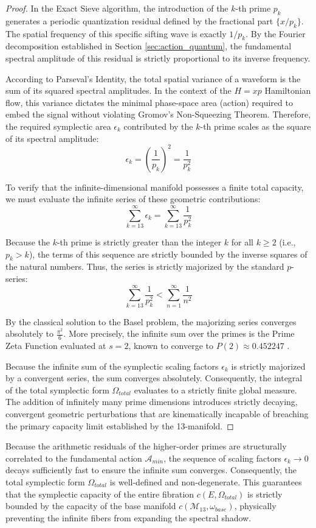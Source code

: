 \documentclass[sn-mathphys-num, pdflatex, referee]{sn-jnl}
\begin{document}
\begin{proof}
In the Exact Sieve algorithm, the introduction of the $k$-th prime $p_k$ generates a periodic quantization residual defined by the fractional part $\{x/p_k\}$. The spatial frequency of this specific sifting wave is exactly $1/p_k$. By the Fourier decomposition established in Section \ref{sec:action_quantum}, the fundamental spectral amplitude of this residual is strictly proportional to its inverse frequency. 

According to Parseval's Identity, the total spatial variance of a waveform is the sum of its squared spectral amplitudes. In the context of the $H=xp$ Hamiltonian flow, this variance dictates the minimal phase-space area (action) required to embed the signal without violating Gromov's Non-Squeezing Theorem. Therefore, the required symplectic area $\epsilon_k$ contributed by the $k$-th prime scales as the square of its spectral amplitude:
$$ \epsilon_k = \left( \frac{1}{p_k} \right)^2 = \frac{1}{p_k^2} $$

To verify that the infinite-dimensional manifold possesses a finite total capacity, we must evaluate the infinite series of these geometric contributions:
$$ \sum_{k=13}^{\infty} \epsilon_k = \sum_{k=13}^{\infty} \frac{1}{p_k^2} $$

Because the $k$-th prime is strictly greater than the integer $k$ for all $k \ge 2$ (i.e., $p_k > k$), the terms of this sequence are strictly bounded by the inverse squares of the natural numbers. Thus, the series is strictly majorized by the standard $p$-series:
$$ \sum_{k=13}^{\infty} \frac{1}{p_k^2} < \sum_{n=1}^{\infty} \frac{1}{n^2} $$

By the classical solution to the Basel problem, the majorizing series converges absolutely to $\frac{\pi^2}{6}$. More precisely, the infinite sum over the primes is the Prime Zeta Function evaluated at $s=2$, known to converge to $P(2) \approx 0.452247$ \cite{froberg1968prime}.

Because the infinite sum of the symplectic scaling factors $\epsilon_k$ is strictly majorized by a convergent series, the sum converges absolutely. Consequently, the integral of the total symplectic form $\Omega_{total}$ evaluates to a strictly finite global measure. The addition of infinitely many prime dimensions introduces strictly decaying, convergent geometric perturbations that are kinematically incapable of breaching the primary capacity limit established by the 13-manifold.
\end{proof}
Because the arithmetic residuals of the higher-order primes are structurally correlated to the fundamental action $\mathcal{A}_{min}$, the sequence of scaling factors $\epsilon_k \rightarrow 0$ decays sufficiently fast to ensure the infinite sum converges. Consequently, the total symplectic form $\Omega_{total}$ is well-defined and non-degenerate. This guarantees that the symplectic capacity of the entire fibration $c(E, \Omega_{total})$ is strictly bounded by the capacity of the base manifold $c(\mathcal{M}_{13}, \omega_{base})$, physically preventing the infinite fibers from expanding the spectral shadow.
\end{document}
